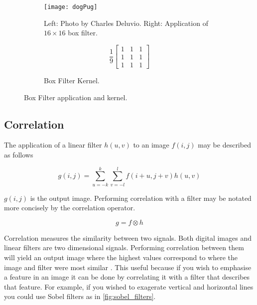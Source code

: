 \begin{figure}[H]
  \centering
  \begin{subfigure}[b]{0.75\textwidth}
    \centering\texttt{[image: dogPug]}
    \caption{Left: Photo by Charles Deluvio. Right: Application of $16\times16$ box filter.}
    \label{fig:roughDog}
  \end{subfigure}
  \begin{subfigure}[b]{0.25\textwidth}
    \centering
    \[
      \frac{1}{9}
    \begin{bmatrix}
       1 & 1 & 1 \\
       1 & 1 & 1 \\
       1 & 1 & 1
    \end{bmatrix}
    \]
    \caption{Box Filter Kernel.}
    \label{fig:boxkernel}
  \end{subfigure}
  \caption{Box Filter application and kernel.}
  \label{fig:boxfilter}
\end{figure}

\subsection{Correlation}
\label{subsection:corr}
The application of a linear filter $h(u,v)$ to an image $f(i,j)$ may be described as follows

\begin{equation} \label{eq:1}
g(i,j) = \sum_{u=-k}^{k}\sum_{v = -l}^{l}f(i+u,j+v)h(u,v)
\end{equation}

$g(i,j)$ is the output image. Performing correlation with a filter may be notated more concisely by the correlation operator.

\[g = f \otimes h\]

Correlation measures the similarity between two signals. Both digital images and linear filters are two dimensional signals. Performing correlation between them will yield an output image where the highest values correspond to where the image and filter were most similar \cite{optimalKernel}. This useful because if you wish to emphasise a feature in an image it can be done by correlating it with a filter that describes that feature. For example, if you wished to exagerate vertical and horizontal lines you could use Sobel filters as in \ref{fig:sobel_filters}. 

